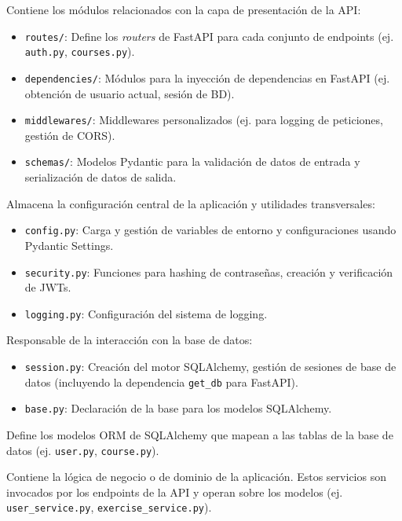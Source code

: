 \begin{description}[leftmargin=*,style=unboxed,font=\normalfont]
  \item[\texttt{src/api/}] Contiene los módulos relacionados con la capa de presentación de la API:
    \begin{itemize}
        \item \texttt{routes/}: Define los \emph{routers} de FastAPI para cada conjunto de endpoints (ej. \texttt{auth.py}, \texttt{courses.py}).
        \item \texttt{dependencies/}: Módulos para la inyección de dependencias en FastAPI (ej. obtención de usuario actual, sesión de BD).
        \item \texttt{middlewares/}: Middlewares personalizados (ej. para logging de peticiones, gestión de CORS).
        \item \texttt{schemas/}: Modelos Pydantic para la validación de datos de entrada y serialización de datos de salida.
    \end{itemize}
  \item[\texttt{src/core/}] Almacena la configuración central de la aplicación y utilidades transversales:
    \begin{itemize}
        \item \texttt{config.py}: Carga y gestión de variables de entorno y configuraciones usando Pydantic Settings.
        \item \texttt{security.py}: Funciones para hashing de contraseñas, creación y verificación de JWTs.
        \item \texttt{logging.py}: Configuración del sistema de logging.
    \end{itemize}
  \item[\texttt{src/database/}] Responsable de la interacción con la base de datos:
    \begin{itemize}
        \item \texttt{session.py}: Creación del motor SQLAlchemy, gestión de sesiones de base de datos (incluyendo la dependencia \texttt{get\_db} para FastAPI).
        \item \texttt{base.py}: Declaración de la base para los modelos SQLAlchemy.
    \end{itemize}
  \item[\texttt{src/models/}] Define los modelos ORM de SQLAlchemy que mapean a las tablas de la base de datos (ej. \texttt{user.py}, \texttt{course.py}).
  \item[\texttt{src/services/}] Contiene la lógica de negocio o de dominio de la aplicación. Estos servicios son invocados por los endpoints de la API y operan sobre los modelos (ej. \texttt{user\_service.py}, \texttt{exercise\_service.py}).

\end{description}
